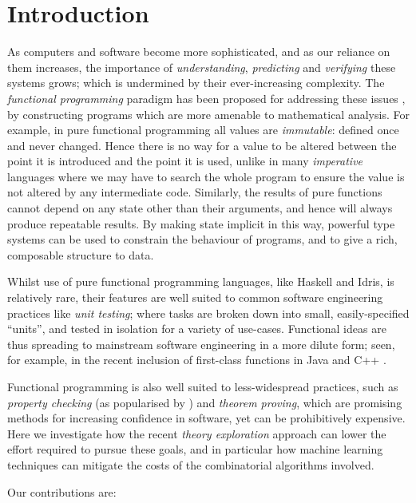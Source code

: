\section{Introduction}

As computers and software become more sophisticated, and as our reliance on them increases, the importance of \emph{understanding}, \emph{predicting} and \emph{verifying} these systems grows; which is undermined by their ever-increasing complexity. The \emph{functional programming} paradigm has been proposed for addressing these issues \cite{hughes1989functional}, by constructing programs which are more amenable to mathematical analysis. For example, in pure functional programming all values are \emph{immutable}: defined once and never changed. Hence there is no way for a value to be altered between the point it is introduced and the point it is used, unlike in many \emph{imperative} languages where we may have to search the whole program to ensure the value is not altered by any intermediate code. Similarly, the results of pure functions cannot depend on any state other than their arguments, and hence will always produce repeatable results. By making state implicit in this way, powerful type systems can be used to constrain the behaviour of programs, and to give a rich, composable structure to data.

Whilst use of pure functional programming languages, like Haskell and Idris, is relatively rare, their features are well suited to common software engineering practices like \emph{unit testing}; where tasks are broken down into small, easily-specified ``units'', and tested in isolation for a variety of use-cases. Functional ideas are thus spreading to mainstream software engineering in a more dilute form; seen, for example, in the recent inclusion of first-class functions in Java \cite{gosling2015java} and C++ \cite{willcock2006lambda}.

Functional programming is also well suited to less-widespread practices, such as \emph{property checking} (as popularised by \qcheck{}) and \emph{theorem proving}, which are promising methods for increasing confidence in software, yet can be prohibitively expensive. Here we investigate how the recent \emph{theory exploration} approach can lower the effort required to pursue these goals, and in particular how machine learning techniques can mitigate the costs of the combinatorial algorithms involved.

Our contributions are:

